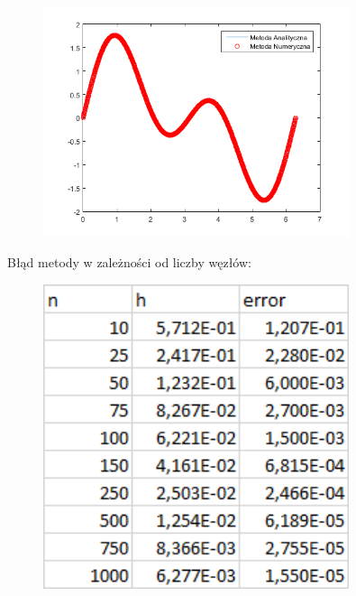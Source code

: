 \begin{figure}[!ht]
	\begin{center}
		\includegraphics[width=0.8\textwidth]{Lab3/charts/zad1/1000.png}
	\end{center}
\end{figure}

\newpage

Błąd metody w zależności od liczby węzłów:

\begin{figure}[!ht]
	\begin{center}
		\includegraphics[width=0.8\textwidth]{Lab3/charts/zad1/error_dane.png}
	\end{center}
\end{figure}

